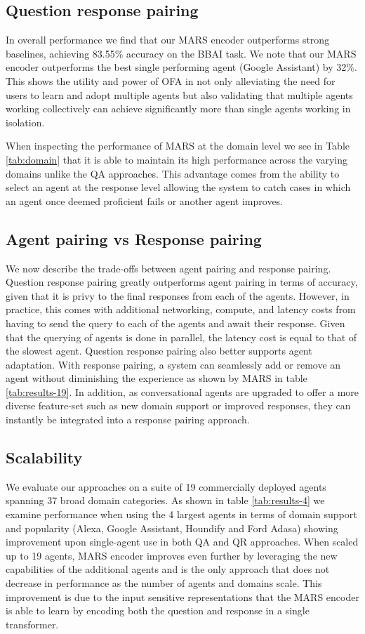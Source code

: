 \documentclass[11pt]{article}
\begin{document}
\subsection{Question response pairing}
In overall performance we find that our MARS encoder outperforms strong baselines, achieving 83.55\% accuracy on the BBAI task. We note that our MARS encoder outperforms the best single performing agent (Google Assistant) by 32\%. This shows the utility and power of OFA in not only alleviating the need for users to learn and adopt multiple agents but also validating that multiple agents working collectively can achieve significantly more than single agents working in isolation.

When inspecting the performance of MARS at the domain level we see in Table \ref{tab:domain} that it is able to maintain its high performance across the varying domains unlike the QA approaches. This advantage comes from the ability to select an agent at the response level allowing the system to catch cases in which an agent once deemed proficient fails or another agent improves.


\subsection{Agent pairing vs Response pairing}
We now describe the trade-offs between agent pairing and response pairing. Question response pairing greatly outperforms agent pairing in terms of accuracy, given that it is privy to the final responses from each of the agents. However, in practice, this comes with additional networking, compute, and latency costs from having to send the query to each of the agents and await their response. Given that the querying of agents is done in parallel, the latency cost is equal to that of the slowest agent. 
Question response pairing also better supports agent adaptation. With response pairing, a system can seamlessly add or remove an agent without diminishing the experience as shown by MARS in table \ref{tab:results-19}. In addition, as conversational agents are upgraded to offer a more diverse feature-set such as new domain support or improved responses, they can instantly be integrated into a response pairing approach.

\subsection{Scalability}
We evaluate our approaches on a suite of 19 commercially deployed agents spanning 37 broad domain categories. As shown in table \ref{tab:results-4} we examine performance when using the 4 largest agents in terms of domain support and popularity (Alexa, Google Assistant, Houndify and Ford Adasa) showing improvement upon single-agent use in both QA and QR approaches. When scaled up to 19 agents, MARS encoder improves even further by leveraging the new capabilities of the additional agents and is the only approach that does not decrease in performance as the number of agents and domains scale. This improvement is due to the input sensitive representations that the MARS encoder is able to learn by encoding both the question and response in a single transformer.
\end{document}
